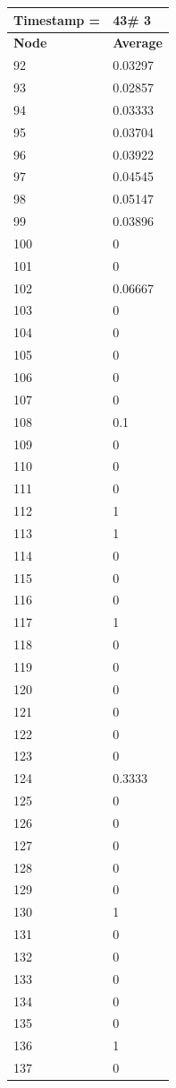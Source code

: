 \begin{tabular}{|l||l|}
\hline
\textbf{Timestamp =} & \textbf{43}\# 3\\\hline
	\textbf{Node} & \textbf{Average} \\ \hline
\hline
	92 & 0.03297 \\ \hline
	93 & 0.02857 \\ \hline
	94 & 0.03333 \\ \hline
	95 & 0.03704 \\ \hline
	96 & 0.03922 \\ \hline
	97 & 0.04545 \\ \hline
	98 & 0.05147 \\ \hline
	99 & 0.03896 \\ \hline
	100 & 0 \\ \hline
	101 & 0 \\ \hline
	102 & 0.06667 \\ \hline
	103 & 0 \\ \hline
	104 & 0 \\ \hline
	105 & 0 \\ \hline
	106 & 0 \\ \hline
	107 & 0 \\ \hline
	108 & 0.1 \\ \hline
	109 & 0 \\ \hline
	110 & 0 \\ \hline
	111 & 0 \\ \hline
	112 & 1 \\ \hline
	113 & 1 \\ \hline
	114 & 0 \\ \hline
	115 & 0 \\ \hline
	116 & 0 \\ \hline
	117 & 1 \\ \hline
	118 & 0 \\ \hline
	119 & 0 \\ \hline
	120 & 0 \\ \hline
	121 & 0 \\ \hline
	122 & 0 \\ \hline
	123 & 0 \\ \hline
	124 & 0.3333 \\ \hline
	125 & 0 \\ \hline
	126 & 0 \\ \hline
	127 & 0 \\ \hline
	128 & 0 \\ \hline
	129 & 0 \\ \hline
	130 & 1 \\ \hline
	131 & 0 \\ \hline
	132 & 0 \\ \hline
	133 & 0 \\ \hline
	134 & 0 \\ \hline
	135 & 0 \\ \hline
	136 & 1 \\ \hline
	137 & 0 \\ \hline
\end{tabular}

